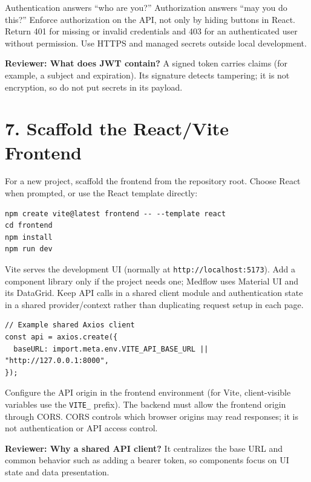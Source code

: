 \documentclass[10pt]{article}
\begin{document}
Authentication answers ``who are you?'' Authorization answers ``may you do this?'' Enforce authorization on the API, not only by hiding buttons in React. Return 401 for missing or invalid credentials and 403 for an authenticated user without permission. Use HTTPS and managed secrets outside local development.

\textbf{Reviewer: What does JWT contain?} A signed token carries claims (for example, a subject and expiration). Its signature detects tampering; it is not encryption, so do not put secrets in its payload.

\section{7. Scaffold the React/Vite Frontend}
For a new project, scaffold the frontend from the repository root. Choose React when prompted, or use the React template directly:
\begin{lstlisting}
npm create vite@latest frontend -- --template react
cd frontend
npm install
npm run dev
\end{lstlisting}
Vite serves the development UI (normally at \texttt{http://localhost:5173}). Add a component library only if the project needs one; Medflow uses Material UI and its DataGrid. Keep API calls in a shared client module and authentication state in a shared provider/context rather than duplicating request setup in each page.
\begin{lstlisting}
// Example shared Axios client
const api = axios.create({
  baseURL: import.meta.env.VITE_API_BASE_URL || "http://127.0.0.1:8000",
});
\end{lstlisting}
Configure the API origin in the frontend environment (for Vite, client-visible variables use the \texttt{VITE\_} prefix). The backend must allow the frontend origin through CORS. CORS controls which browser origins may read responses; it is not authentication or API access control.

\textbf{Reviewer: Why a shared API client?} It centralizes the base URL and common behavior such as adding a bearer token, so components focus on UI state and data presentation.
\end{document}
